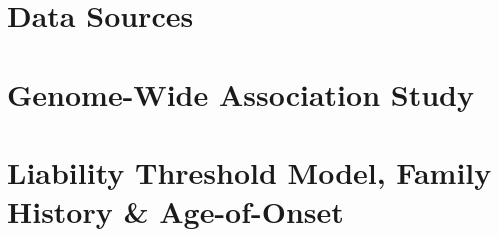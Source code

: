 \section{Data Sources}



\newpage
\section{Genome-Wide Association Study}\label{sec:GWAS}


%
\newpage
\section{Liability Threshold Model, Family History \& Age-of-Onset} \label{sec:methods:LTMs}








